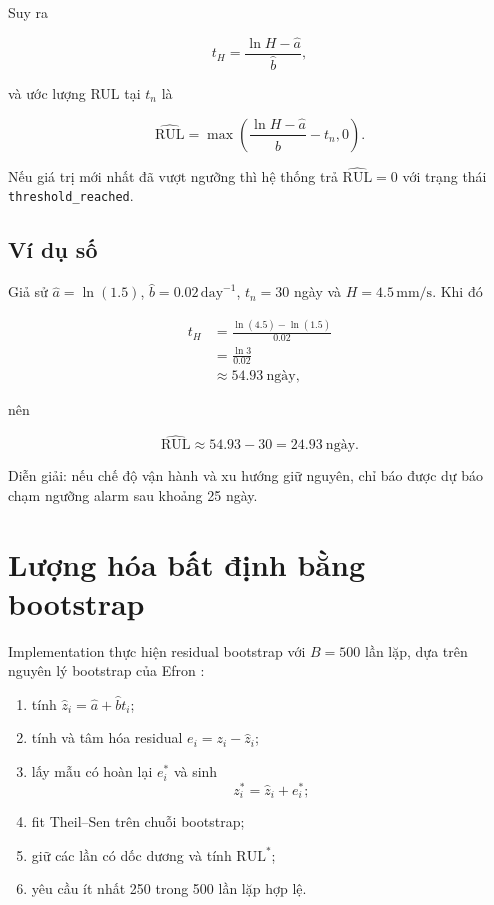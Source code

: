 \documentclass[12pt,a4paper]{article}
\newcommand{\RUL}{\mathrm{RUL}}
\newcommand{\Rhat}{\widehat{\RUL}}
\newcommand{\status}[1]{\texttt{#1}}
\begin{document}
Suy ra

\begin{equation}
  t_H=\frac{\ln H-\widehat a}{\widehat b},
\end{equation}

và ước lượng RUL tại $t_n$ là

\begin{equation}
  \boxed{
  \Rhat=\max\left(
    \frac{\ln H-\widehat a}{\widehat b}-t_n,
    0
  \right).}
  \label{eq:rul-estimator}
\end{equation}

Nếu giá trị mới nhất đã vượt ngưỡng thì hệ thống trả $\Rhat=0$ với trạng thái
\status{threshold\_reached}.

\subsection{Ví dụ số}

Giả sử $\widehat a=\ln(1.5)$, $\widehat b=0.02\,\mathrm{day}^{-1}$, $t_n=30$ ngày và $H=4.5\,\mathrm{mm/s}$. Khi đó

\begin{align}
  t_H
  &=\frac{\ln(4.5)-\ln(1.5)}{0.02}\\
  &=\frac{\ln 3}{0.02}\\
  &\approx54.93\ \text{ngày},
\end{align}

nên

\begin{equation}
  \Rhat\approx54.93-30=24.93\ \text{ngày}.
\end{equation}

Diễn giải: nếu chế độ vận hành và xu hướng giữ nguyên, chỉ báo được dự báo chạm ngưỡng alarm sau khoảng 25 ngày.

\section{Lượng hóa bất định bằng bootstrap}

Implementation thực hiện residual bootstrap với $B=500$ lần lặp, dựa trên nguyên lý bootstrap của Efron \cite{efron1979}:

\begin{enumerate}
  \item tính $\widehat z_i=\widehat a+\widehat b t_i$;
  \item tính và tâm hóa residual $e_i=z_i-\widehat z_i$;
  \item lấy mẫu có hoàn lại $e_i^*$ và sinh
  \begin{equation}
    z_i^*=\widehat z_i+e_i^*;
  \end{equation}
  \item fit Theil--Sen trên chuỗi bootstrap;
  \item giữ các lần có dốc dương và tính $\RUL^*$;
  \item yêu cầu ít nhất 250 trong 500 lần lặp hợp lệ.
\end{enumerate}
\end{document}
